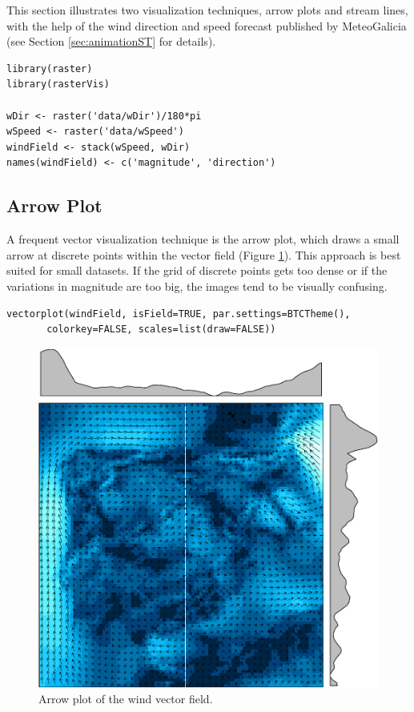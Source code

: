 \documentclass[smallroyalvopaper]{memoir}
\begin{document}
This section illustrates two visualization techniques, arrow plots and
stream lines, with the help of the wind direction and speed forecast
published by MeteoGalicia (see Section \ref{sec:animationST} for
details).


\lstset{language=R,numbers=none}
\begin{lstlisting}
library(raster)
library(rasterVis)

wDir <- raster('data/wDir')/180*pi
wSpeed <- raster('data/wSpeed')
windField <- stack(wSpeed, wDir)
names(windField) <- c('magnitude', 'direction')
\end{lstlisting}

\subsection{Arrow Plot}
\label{sec-1-1}
A frequent vector visualization technique is the arrow plot, which
draws a small arrow at discrete points within the vector field
(Figure \ref{fig:vectorplot}). This approach is best suited for
small datasets. If the grid of discrete points gets too dense or
if the variations in magnitude are too big, the images tend to be
visually confusing.

\lstset{language=R,numbers=none}
\begin{lstlisting}
vectorplot(windField, isField=TRUE, par.settings=BTCTheme(),
	   colorkey=FALSE, scales=list(draw=FALSE))
\end{lstlisting}

\begin{figure}[htb]
\centering
\includegraphics[width=.9\linewidth]{figs/vectorplot.pdf}
\caption{\label{fig:vectorplot}Arrow plot of the wind vector field.}
\end{figure}
\end{document}
